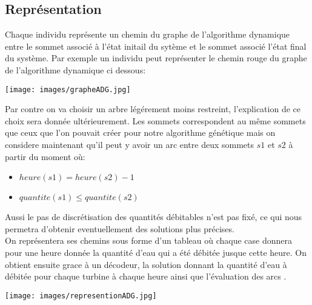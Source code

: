 \documentclass[a4paper]{report}
\begin{document}
\subsection*{Représentation}
Chaque individu représente un chemin du graphe de l'algorithme dynamique entre le sommet associé à l'état initail du sytème et le sommet associé l'état final du système. Par exemple un individu peut représenter le chemin rouge du graphe de l'algorithme dynamique ci dessous:
\begin{center}
  \texttt{[image: images/grapheADG.jpg]}
\end{center} 
Par contre on va choisir un arbre légérement moins restreint, l'explication de ce choix sera donnée ultérieurement. Les sommets correspondent au même sommets que ceux que l'on pouvait créer pour notre algorithme génétique mais on considere maintenant qu'il peut y avoir un arc entre deux sommets $s1$ et $s2$ à partir du moment où:\\
\begin{itemize}
\item $heure(s1)=heure(s2)-1$
\item $quantite(s1)\leq quantite(s2)$
\end{itemize}
Aussi le pas de discrétisation des quantités débitables n'est pas fixé, ce qui nous permetra d'obtenir eventuellement des solutions plus précises.\\
On représentera ses chemins sous forme d'un tableau où chaque case donnera pour une heure donnée la quantité d'eau qui a été débitée jusque cette heure. On obtient ensuite grace à un décodeur, la solution donnant la quantité d'eau à débitée pour chaque turbine à chaque heure ainsi que l'évaluation des arcs .\\

 \begin{center}
 \texttt{[image: images/representionADG.jpg]}
 \end{center}
\end{document}
